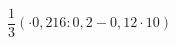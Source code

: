 \begin{ex}[type=calculate]
	\begin{condition}
		\( \dfrac{1}{3}(\cdot0,216:0,2-0,12\cdot10) \)
	\end{condition}
\end{ex}